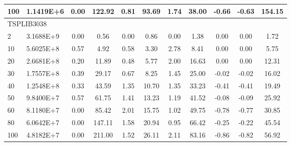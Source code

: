 {\begin{longtable}{@{}llccccccccc@{}}
\multicolumn{1}{l|}{100} & \multicolumn{1}{l|}{1.1419E+6}  & 0.00 & \multicolumn{1}{c|}{122.92}  & 0.81 & \multicolumn{1}{c|}{93.69}   & 1.74 & \multicolumn{1}{c|}{38.00}   & -0.66     & -0.63     & 154.15  \\ \hline
\multicolumn{11}{l}{TSPLIB3038}                                                                                                                                                                                \\ \hline
\multicolumn{1}{l|}{2}   & \multicolumn{1}{l|}{3.1688E+9}  & 0.00 & \multicolumn{1}{c|}{0.56}    & 0.00 & \multicolumn{1}{c|}{0.86}    & 0.00 & \multicolumn{1}{c|}{1.38}    & 0.00      & 0.00      & 1.72    \\
\multicolumn{1}{l|}{10}  & \multicolumn{1}{l|}{5.6025E+8}  & 0.57 & \multicolumn{1}{c|}{4.92}    & 0.58 & \multicolumn{1}{c|}{3.30}    & 2.78 & \multicolumn{1}{c|}{8.41}    & 0.00      & 0.00      & 5.75    \\
\multicolumn{1}{l|}{20}  & \multicolumn{1}{l|}{2.6681E+8}  & 0.20 & \multicolumn{1}{c|}{11.89}   & 0.48 & \multicolumn{1}{c|}{5.77}    & 2.00 & \multicolumn{1}{c|}{16.63}   & 0.00      & 0.00      & 12.31   \\
\multicolumn{1}{l|}{30}  & \multicolumn{1}{l|}{1.7557E+8}  & 0.39 & \multicolumn{1}{c|}{29.17}   & 0.67 & \multicolumn{1}{c|}{8.25}    & 1.45 & \multicolumn{1}{c|}{25.00}   & -0.02     & -0.02     & 16.02   \\
\multicolumn{1}{l|}{40}  & \multicolumn{1}{l|}{1.2548E+8}  & 0.33 & \multicolumn{1}{c|}{43.59}   & 1.35 & \multicolumn{1}{c|}{10.70}   & 1.35 & \multicolumn{1}{c|}{33.23}   & -0.41     & -0.41     & 19.49   \\
\multicolumn{1}{l|}{50}  & \multicolumn{1}{l|}{9.8400E+7}  & 0.57 & \multicolumn{1}{c|}{61.75}   & 1.41 & \multicolumn{1}{c|}{13.23}   & 1.19 & \multicolumn{1}{c|}{41.52}   & -0.08     & -0.09     & 25.92   \\
\multicolumn{1}{l|}{60}  & \multicolumn{1}{l|}{8.1180E+7}  & 0.00 & \multicolumn{1}{c|}{85.42}   & 2.01 & \multicolumn{1}{c|}{15.75}   & 1.02 & \multicolumn{1}{c|}{49.75}   & -0.78     & -0.77     & 30.85   \\
\multicolumn{1}{l|}{80}  & \multicolumn{1}{l|}{6.0642E+7}  & 0.00 & \multicolumn{1}{c|}{147.11}  & 1.58 & \multicolumn{1}{c|}{20.94}   & 0.95 & \multicolumn{1}{c|}{66.42}   & -0.25     & -0.22     & 45.54   \\
\multicolumn{1}{l|}{100} & \multicolumn{1}{l|}{4.8182E+7}  & 0.00 & \multicolumn{1}{c|}{211.00}  & 1.52 & \multicolumn{1}{c|}{26.11}   & 2.11 & \multicolumn{1}{c|}{83.16}   & -0.86     & -0.82     & 56.92   \\ \hline

\end{longtable}}
